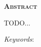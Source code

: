 \begin{center}
	{\Large{\textbf{\mscThesisEnglishTitle}}}
\end{center}

\vspace{1cm}


\vspace{1cm}

\begin{center}
	\Large{\textsc{\textbf{Abstract}}}
\end{center}

\noindent TODO...

\noindent\textit{Keywords}: 
